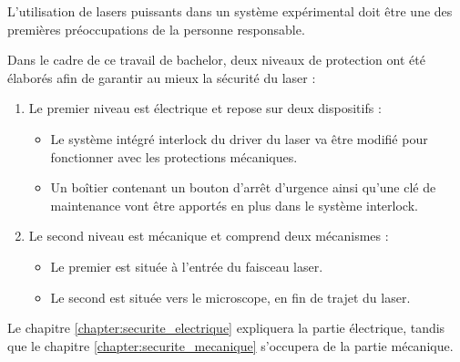 L'utilisation de lasers puissants dans un système expérimental doit être une des premières préoccupations de la personne responsable.

Dans le cadre de ce travail de bachelor, deux niveaux de protection ont été élaborés afin de garantir au mieux la sécurité du laser :

\begin{enumerate}
    \item Le premier niveau est électrique et repose sur deux dispositifs :
          \begin{itemize}
              \item Le système intégré interlock du driver du laser va être modifié pour fonctionner avec les protections mécaniques.
              \item Un boîtier contenant un bouton d'arrêt d'urgence ainsi qu'une clé de maintenance vont être apportés en plus dans le système interlock.
          \end{itemize}
    \item Le second niveau est mécanique et comprend deux mécanismes :
          \begin{itemize}
              \item Le premier est située à l'entrée du faisceau laser.
              \item Le second est située vers le microscope, en fin de trajet du laser.
          \end{itemize}
\end{enumerate}

Le chapitre \ref{chapter:securite_electrique} expliquera la partie électrique, tandis que le chapitre \ref{chapter:securite_mecanique} s'occupera de la partie mécanique.